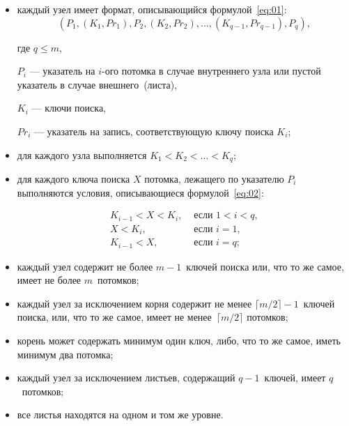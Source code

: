 \begin{itemize}
    \item каждый узел имеет формат, описывающийся формулой~\eqref{eq:01}:
        \begin{equation}\label{eq:01}
            (P_1, (K_1, Pr_1), P_2, (K_2, Pr_2), \dots, (K_{q-1}, Pr_{q-1}),
            P_q),
        \end{equation}

        где $q \leqslant m$,

        $P_i$ --- указатель на $i$-ого потомка в случае внутреннего узла или
        пустой указатель в случае внешнего~(листа),

        $K_i$ --- ключи поиска,

        $Pr_i$ --- указатель на запись, соответствующую ключу поиска $K_i$;

    \item для каждого узла выполняется $K_1 < K_2 < \dots < K_q$;

    \item для каждого ключа поиска $X$ потомка, лежащего по указателю $P_i$
        выполняются условия, описывающиеся формулой~\eqref{eq:02}:

        \begin{equation}\label{eq:02}
            \begin{aligned}
                K_{i-1} < X < K_i, & \text{ если } 1 < i < q,\\
                X < K_i, & \text{ если } i = 1,\\
                K_{i-1} < X, & \text{ если } i = q;
            \end{aligned}
        \end{equation}

    \item каждый узел содержит не более $m - 1$~ключей поиска или, что то же
        самое, имеет не более $m$~потомков;

    \item каждый узел за исключением корня содержит не менее $\lceil m / 2
        \rceil - 1$~ключей поиска, или, что то же самое, имеет не менее~$\lceil
        m / 2 \rceil$ потомков;

    \item корень может содержать минимум один ключ, либо, что то же самое, иметь
        минимум два потомка;

    \item каждый узел за исключением листьев, содержащий $q-1$~ключей, имеет
        $q$~потомков;

    \item все листья находятся на одном и том же уровне.
\end{itemize}

